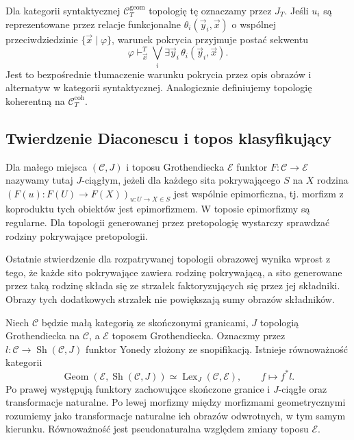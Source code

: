 Dla kategorii syntaktycznej $\mathcal C_T^{\mathrm{geom}}$ topologię tę oznaczamy przez $J_T$. Jeśli $u_i$ są reprezentowane przez relacje funkcjonalne $\theta_i(\vec y_i,\vec x)$ o wspólnej przeciwdziedzinie $\{\vec x\mid\varphi\}$, warunek pokrycia przyjmuje postać sekwentu
\[
 \varphi\vdash_{\vec x}^T
 \bigvee_i\exists\vec y_i\,\theta_i(\vec y_i,\vec x).
\]
Jest to bezpośrednie tłumaczenie warunku pokrycia przez opis obrazów i alternatyw w kategorii syntaktycznej. Analogicznie definiujemy topologię koherentną na $\mathcal C_T^{\mathrm{coh}}$.

\subsection{Twierdzenie Diaconescu i topos klasyfikujący}

\begin{definicja}\label{cat:def:cl-site-continuous}
Dla małego miejsca $(\mathcal C,J)$ i toposu Grothendiecka $\mathcal E$ funktor $F:\mathcal C\to\mathcal E$ nazywamy tutaj $J$-ciągłym, jeżeli dla każdego sita pokrywającego $S$ na $X$ rodzina $(F(u):F(U)\to F(X))_{u:U\to X\in S}$ jest wspólnie epimorficzna, tj. morfizm z koproduktu tych obiektów jest epimorfizmem. W toposie epimorfizmy są regularne. Dla topologii generowanej przez pretopologię wystarczy sprawdzać rodziny pokrywające pretopologii.
\end{definicja}

Ostatnie stwierdzenie dla rozpatrywanej topologii obrazowej wynika wprost z tego, że każde sito pokrywające zawiera rodzinę pokrywającą, a sito generowane przez taką rodzinę składa się ze strzałek faktoryzujących się przez jej składniki. Obrazy tych dodatkowych strzałek nie powiększają sumy obrazów składników.

\begin{twierdzenie}\label{cat:thm:cl-diaconescu}
Niech $\mathcal C$ będzie małą kategorią ze skończonymi granicami, $J$ topologią Grothendiecka na $\mathcal C$, a $\mathcal E$ toposem Grothendiecka. Oznaczmy przez $l:\mathcal C\to\operatorname{Sh}(\mathcal C,J)$ funktor Yonedy złożony ze snopifikacją. Istnieje równoważność kategorii
\[
 \operatorname{Geom}(\mathcal E,\operatorname{Sh}(\mathcal C,J))
 \simeq
 \operatorname{Lex}_J(\mathcal C,\mathcal E),
 \qquad f\longmapsto f^*l.
\]
Po prawej występują funktory zachowujące skończone granice i $J$-ciągłe oraz transformacje naturalne. Po lewej morfizmy między morfizmami geometrycznymi rozumiemy jako transformacje naturalne ich obrazów odwrotnych, w tym samym kierunku. Równoważność jest pseudonaturalna względem zmiany toposu $\mathcal E$.
\end{twierdzenie}

